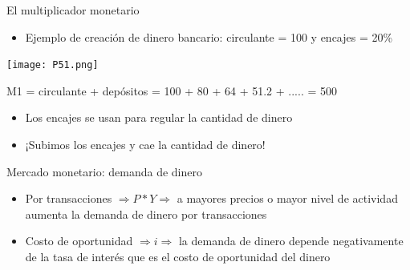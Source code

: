 \documentclass{beamer}
\begin{document}

\begin{frame}{El multiplicador monetario}

    \begin{itemize}
        \item Ejemplo de creación de dinero bancario:  circulante = 100  y  encajes = 20\%
    \end{itemize}
    
    \vspace{2mm}

    \centering\texttt{[image: P51.png]}\
    
    \vspace{2mm}
    
    \begin{tcolorbox}[width=4in, interior hidden, boxsep=0pt,
                  left=0pt, halign=center, valign=center, right=0pt,
                  bottom=3pt, top=3pt, ]%
                 \footnotesize{M1 = circulante + depósitos = 100 + 80 + 64 + 51.2 + ..... = 500}
    \end{tcolorbox}
    
    \vspace{2mm}
    
    \begin{itemize}
        \item Los encajes se usan para regular la cantidad de dinero
        \item ¡Subimos los encajes y cae la cantidad de dinero!  \Large{}
        \end{itemize}

\end{frame}


\begin{frame}{Mercado monetario: demanda de dinero}

    \begin{itemize}
        \item Por transacciones $\Rightarrow P*Y \Rightarrow$ a mayores precios o mayor nivel de actividad aumenta la demanda de dinero por transacciones

        \item Costo de oportunidad $\Rightarrow i \Rightarrow $ la demanda de dinero depende negativamente de la tasa de interés que es el costo de oportunidad del dinero
    \end{itemize}

\end{frame}
\end{document}
